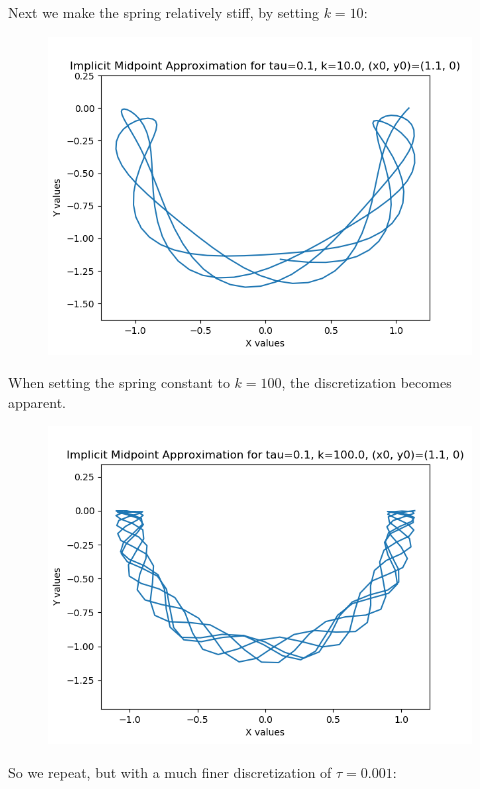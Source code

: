 \documentclass{article}
\theoremstyle{definition}
\begin{document}
\begin{itemize}
\begin{figure}[H]
		\end{figure}
		Next we make the spring relatively stiff, by setting $k=10$:
		\begin{figure}[H]
			\includegraphics[scale=0.6]{mid_spring_01_10}
		\end{figure}
		When setting the spring constant to $k=100$, the
		discretization becomes apparent.
		\begin{figure}[H]
			\includegraphics[scale=0.6]{mid_spring_01_100}
		\end{figure}
		So we repeat, but with a much finer discretization of
		$\tau=0.001$:
		\begin{figure}[H]

\end{figure}
\end{itemize}
\end{document}
